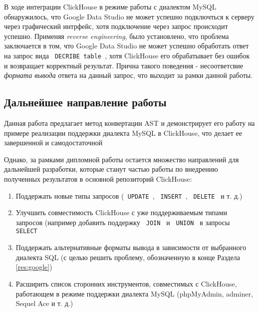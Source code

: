 В ходе интеграции ClickHouse в режиме работы с диалектом MySQL обнаружилось, что Google Data Studio не может успешно подключться к серверу через графический интрфейс, хотя подключение через запрос происходит успешно. Применяя \textit{reverse engineering}, было установлено, что проблема заключается в том, что Google Data Studio не может успешно обработать ответ на запрос вида \texttt{ DECRIBE table }, хотя ClickHouse его обрабатывает без ошибок и возвращает корректный результат. Прична такого поведения - несоответсвие \textit{формата вывода} ответа на данный запрос, что выходит за рамки данной работы. 

\subsection{Дальнейшее направление работы}
Данная работа предлагает метод конвертации AST и демонстрирует его работу на примере реализации поддержки диалекта MySQL в ClickHouse, что делает ее завершенной и самодостаточной

Однако, за рамками дипломной работы остается множество направлений для дальнейшей разработки, которые станут частью работы по внедрению полученных результатов в основной репозиторий ClickHouse:
\begin{enumerate}
    \item Поддержать новые типы запросов (\texttt{ UPDATE }, \texttt{ INSERT }, \texttt{ DELETE } и т. д.)
    \item Улучшить совместимость ClickHouse с уже поддерживаемым типами запросов (например добавить поддержку \texttt{ JOIN } и \texttt{ UNION } в запросы \texttt{ SELECT }
    \item Поддержать альтернативные форматы вывода в зависимости от выбранного диалекта SQL (с целью решить проблему, обозначенную в конце Раздела \ref{res:google})
    \item Расширить список сторонних инструментов, совместимых с ClickHouse, работающем в режиме поддержки диалекта MySQL (phpMyAdmin, adminer, Sequel Ace и т. д.)
\end{enumerate}
